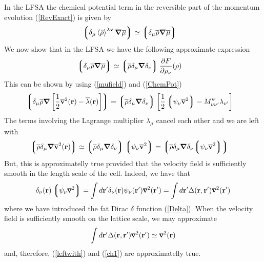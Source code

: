 \documentclass[b5paper,openright,10pt]{book}
\newcommand{\llangle}{\left\langle}
\newcommand{\rrangle}{\right\rangle}
\newcommand{\llg}{\left\lgroup}
\newcommand{\rlg}{\right\rgroup}
\begin{document}
\begin{appendices}
In the LFSA the chemical potential  term in the reversible part of the
momentum evolution (\ref{RevExact}) is given by
\begin{align}
  \llg\delta_\mu\llangle\hat{\rho}\rrangle^{\lambda{\bf v}}\boldsymbol{\nabla}\overline{\mu}\rlg
&\simeq\llg\delta_\mu\overline{\rho}\boldsymbol{\nabla}\overline{\mu}\rlg
\end{align}
We now show that in the LFSA we have the following approximate expression
  \begin{align}
  \llg\delta_\mu\overline{\rho}\boldsymbol{\nabla}\overline{\mu}\rlg&\simeq
\llg\overline{\rho}\delta_{\mu}\boldsymbol{\nabla}\delta_{\nu}\rlg
\frac{\partial  F}{\partial \rho_{\nu}}(\rho)
\label{ch1}
  \end{align}
This can be shown by using (\ref{mufield}) and (\ref{ChemPot})
  \begin{align}
  \llg\delta_\mu\overline{\rho}\boldsymbol{\nabla}\left[
\frac{1}{2}\overline{\bf v}^2({\bf r})-\overline{\lambda}({\bf r})\right]
\rlg&=
\llg\overline{\rho}\delta_{\mu}\boldsymbol{\nabla}\delta_{\nu}\rlg
\left[\frac{1}{2}\llg\psi_\nu\overline{\bf v}^2\rlg-  M^{\psi}_{\nu\nu'}\lambda_{\nu'}\right]
  \end{align}
The terms involving the Lagrange multiplier $\lambda_\mu$ cancel each other and we 
are left with 
\begin{align}
  \llg\overline{\rho}\delta_\mu\boldsymbol{\nabla}
\overline{\bf v}^2({\bf r})
\rlg&\simeq
\llg\overline{\rho}\delta_{\mu}\boldsymbol{\nabla}\delta_{\nu}\rlg
\llg\psi_\nu\overline{\bf v}^2\rlg
=\llg\overline{\rho}\delta_{\mu}\boldsymbol{\nabla}\delta_{\nu}{\llg\psi_\nu\overline{\bf v}^2\rlg}\rlg
\label{leftwith}
\end{align}
But, this is approximatelly true provided that the velocity field is sufficiently smooth
in the length scale of the cell. Indeed, we have that 
\begin{align}
\delta_{\nu}({\bf r})\llg\psi_\nu\overline{\bf v}^2\rlg=
\int d{\bf r}'
\delta_{\nu}({\bf r})\psi_\nu({\bf r}')\overline{\bf v}^2({\bf r}')=
\int d{\bf r}'
\Delta({\bf r},{\bf r}')\overline{\bf v}^2({\bf r}')
\end{align}
where we have introduced the fat Dirac $\delta$ function (\ref{Delta}). When the
velocity field is sufficiently smooth on the lattice scale, we may approximate
\begin{align}
  \int d{\bf r}'
\Delta({\bf r},{\bf r}')\overline{\bf v}^2({\bf r}')\simeq \overline{\bf v}^2({\bf r})
\end{align}
and, therefore, (\ref{leftwith}) and (\ref{ch1}) are approximatelly true. 


\end{appendices}
\end{document}
